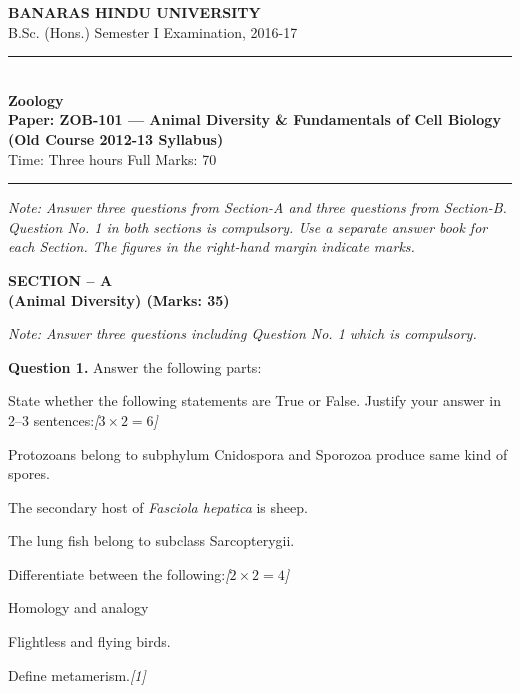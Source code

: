 \documentclass[11pt,a4paper]{article}
\newcommand{\pts}[1]{\hfill   \textit{[#1]}}
\begin{document}
\begin{center}
  {\large\bfseries BANARAS HINDU UNIVERSITY}\\[2pt]
  {\normalsize B.Sc. (Hons.) Semester I Examination, 2016-17}\\[6pt]
  \rule{0.8\linewidth}{0.5pt}\\[6pt]
  {\large\bfseries Zoology}\\[4pt]
  {\large\bfseries Paper: ZOB-101 --- Animal Diversity \& Fundamentals of Cell Biology}\\[2pt]
  {\normalsize   \textbf{(Old Course 2012-13 Syllabus)}}\\[4pt]
  {\normalsize Time: Three hours \hfill Full Marks: 70}
\end{center}

\rule{\linewidth}{0.4pt}

\smallskip



\noindent   \textit{Note: Answer three questions from Section-A and three questions from Section-B. Question No. 1 in both sections is compulsory. Use a separate answer book for each Section. The figures in the right-hand margin indicate marks.}

\bigskip

\begin{center}
   \textbf{SECTION -- A} \\
   \textbf{(Animal Diversity) (Marks: 35)}
\end{center}

\smallskip



\noindent   \textit{Note: Answer three questions including Question No. 1 which is compulsory.}

\medskip


\noindent   \textbf{Question 1.} Answer the following parts:

\begin{parts}
  \item State whether the following statements are True or False. Justify your answer in 2--3 sentences:\pts{$3  \times 2 = 6$}
  
\begin{parts}
    \item Protozoans belong to subphylum Cnidospora and Sporozoa produce same kind of spores.
    \item The secondary host of   \textit{Fasciola hepatica} is sheep.
    \item The lung fish belong to subclass Sarcopterygii.
  \end{parts}

  \item Differentiate between the following:\pts{$2  \times 2 = 4$}
  
\begin{parts}
    \item Homology and analogy
    \item Flightless and flying birds.
  \end{parts}

  \item Define metamerism.\pts{1}
\end{parts}
\end{document}
